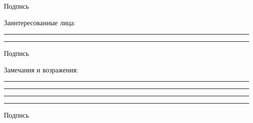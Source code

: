 \documentclass[a4paper,10pt]{report}
\begin{document}
\hspace{10.5cm} {\footnotesize Подпись}

\vspace{0mm}
\centering
\raggedright Заинтересованные лица: \\ \hspace{1.7cm}
\raggedright\textbf{  }
\vspace{-3mm}

\centering 
\rule{50mm}{0.1mm} \hspace{5cm} \rule{50mm}{0.1mm}

\hspace{10.5cm} {\footnotesize Подпись}

\vspace{5mm}

\raggedright
Замечания и возражения: 

\rule{175mm}{0.1mm}
\rule{175mm}{0.1mm}
\rule{175mm}{0.1mm}

\vspace{5mm}
\hspace{11cm} \rule{50mm}{0.1mm}

\hspace{13cm} {\footnotesize Подпись}
\end{document}
